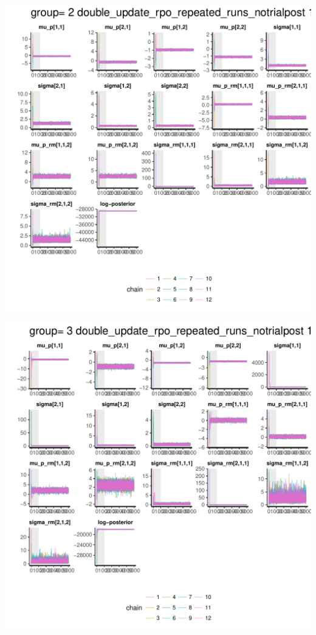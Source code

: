 \documentclass{article}\usepackage[]{graphicx}\usepackage[]{color}
\makeatletter
\def\maxwidth{ %
  \ifdim\Gin@nat@width>\linewidth
    \linewidth
  \else
    \Gin@nat@width
  \fi
}
\newenvironment{knitrout}{}{} %
\makeatother
\begin{document}
\begin{knitrout}
\includegraphics[width=\maxwidth]{figure/unnamed-chunk-10-3} 

\includegraphics[width=\maxwidth]{figure/unnamed-chunk-10-4} 

\end{knitrout}
\end{document}
